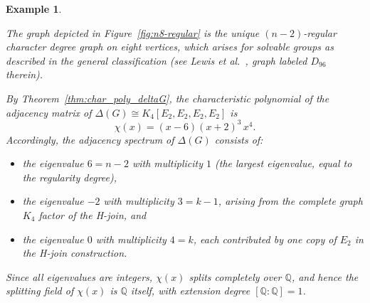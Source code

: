 \documentclass[11pt]{amsart}
\newtheorem{exam}[thm]{\bf Example}
\begin{document}
\begin{exam}
\begin{center}
    \label{fig:n8-regular}
\end{center}

The graph depicted in Figure~\ref{fig:n8-regular} is the unique $(n-2)$-regular character degree graph on eight vertices, which arises for solvable groups as described in the general classification (see Lewis \emph{et al.}~\cite[p.~38]{Lewis2026}, graph labeled $D_{96}$ therein).

By Theorem~\ref{thm:char_poly_deltaG}, the characteristic polynomial of the adjacency matrix of $\Delta(G) \cong K_4[E_2, E_2, E_2, E_2]$ is
\[
\chi(x) = (x - 6)(x + 2)^3\, x^4.
\]
Accordingly, the adjacency spectrum of $\Delta(G)$ consists of:
\begin{itemize}
    \item the eigenvalue $6 = n - 2$ with multiplicity $1$ (the largest eigenvalue, equal to the regularity degree),
    \item the eigenvalue $-2$ with multiplicity $3 = k - 1$, arising from the complete graph $K_4$ factor of the H-join, and
    \item the eigenvalue $0$ with multiplicity $4 = k$, each contributed by one copy of $E_2$ in the H-join construction.
\end{itemize}
Since all eigenvalues are integers, $\chi(x)$ splits completely over $\mathbb{Q}$, and hence the splitting field of $\chi(x)$ is $\mathbb{Q}$ itself, with extension degree $[\mathbb{Q} : \mathbb{Q}] = 1$.
\end{exam}
\end{document}

